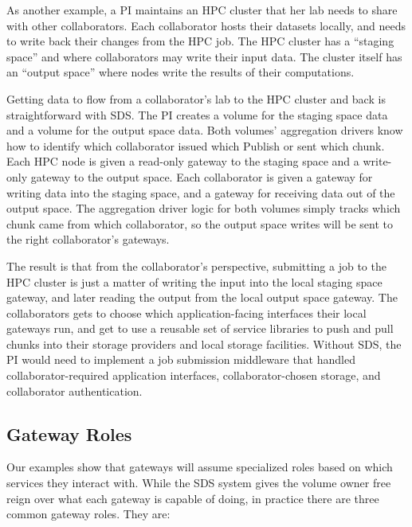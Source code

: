 As another example, a PI maintains an HPC cluster that her lab needs to share
with other collaborators.  Each collaborator hosts their datasets locally, and
needs to write back their changes from the HPC job.  The HPC cluster has a
``staging space'' and where collaborators may write their input data.  The
cluster itself has an ``output space'' where nodes write the results of their
computations.

Getting data to flow from a collaborator's lab to the HPC cluster and back is
straightforward with SDS.  The PI creates a volume for the staging space data
and a volume for the output space data.  Both volumes' aggregation drivers know
how to identify which collaborator issued which Publish or sent which chunk.
Each HPC node is given a read-only gateway to the staging space and a write-only
gateway to the output space.  Each collaborator is given a gateway for writing
data into the staging space, and a gateway for receiving data out of the output
space.  The aggregation driver logic for both volumes simply tracks which chunk
came from which collaborator, so the output space writes will be sent to the
right collaborator's gateways.

The result is that from the collaborator's perspective, submitting a job to the HPC
cluster is just a matter of writing the input into the local staging space
gateway, and later reading the output from the local output space gateway.  The
collaborators gets to choose which application-facing interfaces their local
gateways run, and get to use a reusable set of service libraries to push and pull
chunks into their storage providers and local storage facilities.
Without SDS, the PI would need to implement a job submission middleware that
handled collaborator-required application interfaces, collaborator-chosen
storage, and collaborator authentication.

\subsection{Gateway Roles}

Our examples show that gateways will assume specialized roles based on
which services they interact with.
While the SDS system gives the volume owner free reign over what each gateway is
capable of doing, in practice there are three common gateway roles.
They are:

